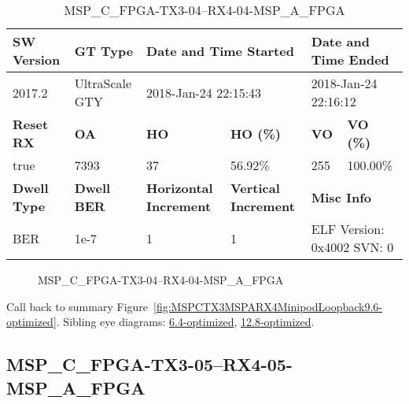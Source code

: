 \begin{table}[h]
\centering
\caption{MSP\_C\_FPGA-TX3-04--RX4-04-MSP\_A\_FPGA}
\label{tab:MSPCFPGATX304RX404MSPAFPGA9.6-optimized}
\begin{tabular}{@{}|l|l|l|l|l|l|@{}}
\toprule
\textbf{SW Version}                & \textbf{GT Type}   & \multicolumn{2}{l|}{\textbf{Date and Time Started}}            & \multicolumn{2}{l|}{\textbf{Date and Time Ended}}        \\ \midrule
2017.2                       & UltraScale GTY          & \multicolumn{2}{l|}{2018-Jan-24 22:15:43}                   & \multicolumn{2}{l|}{2018-Jan-24 22:16:12}               \\ \midrule
\textbf{Reset RX}                  & \textbf{OA} & \textbf{HO}   & \textbf{HO (\%)} & \textbf{VO} & \textbf{VO (\%)} \\ \midrule
true & 7393        & 37          & 56.92\%        & 255        & 100.00\%       \\ \midrule
\textbf{Dwell Type}                & \textbf{Dwell BER} & \textbf{Horizontal Increment} & \textbf{Vertical Increment}    & \multicolumn{2}{l|}{\textbf{Misc Info}}                  \\ \midrule
BER                            & 1e-7        & 1        & 1           & \multicolumn{2}{l|}{ELF Version: 0x4002 SVN: 0}                         \\ \bottomrule
\end{tabular}
\end{table}

\begin{figure}[h]
\caption{MSP\_C\_FPGA-TX3-04--RX4-04-MSP\_A\_FPGA} \label{fig:MSPCFPGATX304RX404MSPAFPGA9.6-optimized}
\end{figure}

Call back to summary Figure~\ref{fig:MSPCTX3MSPARX4MinipodLoopback9.6-optimized}.
Sibling eye diagrams: \hyperref[sec:MSPCFPGATX304RX404MSPAFPGA6.4-optimized]{6.4-optimized}, \hyperref[sec:MSPCFPGATX304RX404MSPAFPGA12.8-optimized]{12.8-optimized}.

\clearpage
\newpage


\subsection{MSP\_C\_FPGA-TX3-05--RX4-05-MSP\_A\_FPGA}\label{sec:MSPCFPGATX305RX405MSPAFPGA9.6-optimized}

